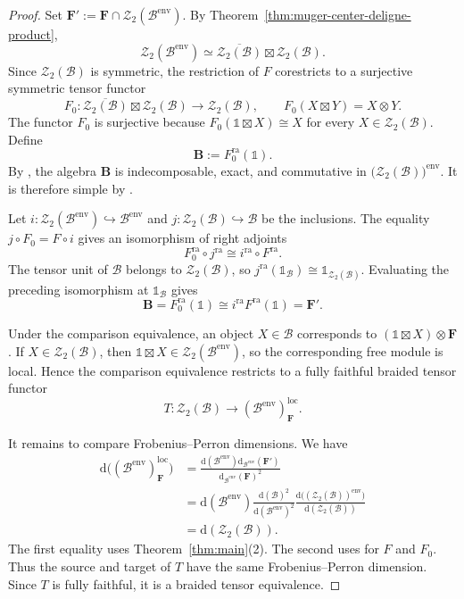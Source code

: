 \documentclass[11pt,reqno]{amsart}
\numberwithin{equation}{section}
\theoremstyle{plain}
\theoremstyle{definition}
\theoremstyle{remark}
\newcommand{\unit}{\mathds{1}}
\newcommand{\B}{\mathcal{B}}
\newcommand{\Z}{\mathcal{Z}}
\newcommand{\loc}{\mathrm{loc}}
\newcommand{\ra}{\mathrm{ra}}
\newcommand{\FP}{\mathrm{d}}
\newcommand{\bF}{\mathbf{F}}
\begin{document}
\begin{proof}
Set $\bF':=\bF\cap\Z_2(\B^{\mathrm{env}})$. By
Theorem~\ref{thm:muger-center-deligne-product},
\[
  \Z_2(\B^{\mathrm{env}})
  \simeq
  \overline{\Z_2(\B)}\boxtimes\Z_2(\B).
\]
Since $\Z_2(\B)$ is symmetric, the restriction of $F$ corestricts to a
surjective symmetric tensor functor
\[
  F_0:\overline{\Z_2(\B)}\boxtimes\Z_2(\B)
  \longrightarrow\Z_2(\B),
  \qquad
  F_0(X\boxtimes Y)=X\otimes Y.
\]
The functor $F_0$ is surjective because
$F_0(\unit\boxtimes X)\cong X$ for every $X\in\Z_2(\B)$. Define
\[
  \mathbf{B}:=F_0^\ra(\unit).
\]
By \cite[Proposition~6.6]{shimizu2026commutative}, the algebra $\mathbf B$
is indecomposable, exact, and commutative in
$\bigl(\Z_2(\B)\bigr)^{\mathrm{env}}$. It is therefore simple by
\cite[Theorem~7.1]{coulembier2025simple}.

Let $i:\Z_2(\B^{\mathrm{env}})\hookrightarrow\B^{\mathrm{env}}$ and
$j:\Z_2(\B)\hookrightarrow\B$ be the inclusions. The equality
$j\circ F_0=F\circ i$ gives an isomorphism of right adjoints
\[
  F_0^{\ra}\circ j^{\ra}\cong i^{\ra}\circ F^\ra.
\]
The tensor unit of $\B$ belongs to $\Z_2(\B)$, so
$j^{\ra}(\unit_{\B})\cong\unit_{\Z_2(\B)}$. Evaluating the preceding
isomorphism at $\unit_{\B}$ gives
\[
  \mathbf{B} = F_0^{\ra}(\unit) \cong i^{\ra} F^\ra(\unit) = \bF'.
\]

Under the comparison equivalence, an object $X\in\B$ corresponds to
$(\unit\boxtimes X)\otimes\bF$. If $X\in\Z_2(\B)$, then
$\unit\boxtimes X\in\Z_2(\B^{\mathrm{env}})$, so the corresponding free
module is local. Hence the comparison equivalence restricts to a fully
faithful braided tensor functor
\[
  T:\Z_2(\B)\longrightarrow(\B^{\mathrm{env}})_\bF^\loc.
\]

It remains to compare Frobenius--Perron dimensions. We have
\[
\begin{aligned}
\FP\bigl((\B^{\mathrm{env}})_\bF^\loc\bigr)
&=
\frac{
  \FP(\B^{\mathrm{env}})\FP_{\B^{\mathrm{env}}}(\bF')
}{
  \FP_{\B^{\mathrm{env}}}(\bF)^2
}
\\
&=
\FP(\B^{\mathrm{env}})
\frac{\FP(\B)^2}{\FP(\B^{\mathrm{env}})^2}
\frac{
  \FP\bigl((\Z_2(\B))^{\mathrm{env}}\bigr)
}{
  \FP(\Z_2(\B))
}
\\
&=
\FP(\Z_2(\B)).
\end{aligned}
\]
The first equality uses Theorem~\ref{thm:main}(2). The second uses
\cite[Proposition~6.6(d)]{shimizu2026commutative} for $F$ and $F_0$.
Thus the source and target of $T$ have the same Frobenius--Perron dimension.
Since $T$ is fully faithful, it is a braided tensor equivalence.
\end{proof}
\end{document}
